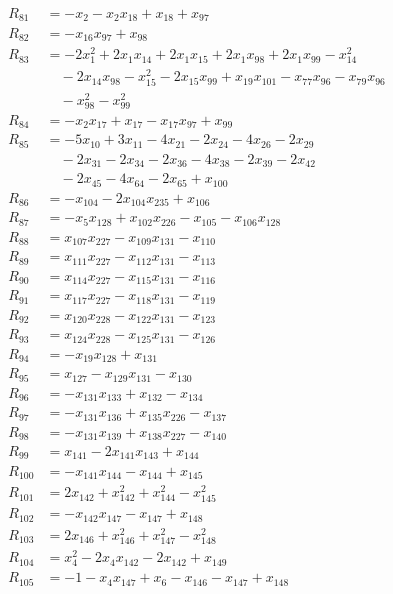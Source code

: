\begin{align*}
R_{81}&=-x_{2}-x_{2}x_{18}+x_{18}+x_{97}\\
R_{82}&=-x_{16}x_{97}+x_{98}\\
R_{83}&=-2x_{1}^{2}+2x_{1}x_{14}+2x_{1}x_{15}+2x_{1}x_{98}+2x_{1}x_{99}-x_{14}^{2}\\
&\quad{}-2x_{14}x_{98}-x_{15}^{2}-2x_{15}x_{99}+x_{19}x_{101}-x_{77}x_{96}-x_{79}x_{96}\\
&\quad{}-x_{98}^{2}-x_{99}^{2}\\
R_{84}&=-x_{2}x_{17}+x_{17}-x_{17}x_{97}+x_{99}\\
R_{85}&=-5x_{10}+3x_{11}-4x_{21}-2x_{24}-4x_{26}-2x_{29}\\
&\quad{}-2x_{31}-2x_{34}-2x_{36}-4x_{38}-2x_{39}-2x_{42}\\
&\quad{}-2x_{45}-4x_{64}-2x_{65}+x_{100}\\
R_{86}&=-x_{104}-2x_{104}x_{235}+x_{106}\\
R_{87}&=-x_{5}x_{128}+x_{102}x_{226}-x_{105}-x_{106}x_{128}\\
R_{88}&=x_{107}x_{227}-x_{109}x_{131}-x_{110}\\
R_{89}&=x_{111}x_{227}-x_{112}x_{131}-x_{113}\\
R_{90}&=x_{114}x_{227}-x_{115}x_{131}-x_{116}\\
R_{91}&=x_{117}x_{227}-x_{118}x_{131}-x_{119}\\
R_{92}&=x_{120}x_{228}-x_{122}x_{131}-x_{123}\\
R_{93}&=x_{124}x_{228}-x_{125}x_{131}-x_{126}\\
R_{94}&=-x_{19}x_{128}+x_{131}\\
R_{95}&=x_{127}-x_{129}x_{131}-x_{130}\\
R_{96}&=-x_{131}x_{133}+x_{132}-x_{134}\\
R_{97}&=-x_{131}x_{136}+x_{135}x_{226}-x_{137}\\
R_{98}&=-x_{131}x_{139}+x_{138}x_{227}-x_{140}\\
R_{99}&=x_{141}-2x_{141}x_{143}+x_{144}\\
R_{100}&=-x_{141}x_{144}-x_{144}+x_{145}\\
R_{101}&=2x_{142}+x_{142}^{2}+x_{144}^{2}-x_{145}^{2}\\
R_{102}&=-x_{142}x_{147}-x_{147}+x_{148}\\
R_{103}&=2x_{146}+x_{146}^{2}+x_{147}^{2}-x_{148}^{2}\\
R_{104}&=x_{4}^{2}-2x_{4}x_{142}-2x_{142}+x_{149}\\
R_{105}&=-1-x_{4}x_{147}+x_{6}-x_{146}-x_{147}+x_{148}\\

\end{align*}

